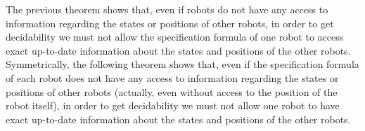  The previous theorem shows that, even if robots do not have any access to information regarding the states or positions of other robots, in order to get decidability we must not allow the specification formula of one robot to access exact up-to-date information about the states and positions of the other robots. Symmetrically, the following theorem shows that, even if the specification formula of each robot does not have any access to information regarding the states or positions of other robots (actually, even without access to the position of the robot itself), in order to get decidability we must not allow one robot to have exact up-to-date information about the states and positions of the other robots.


% 


